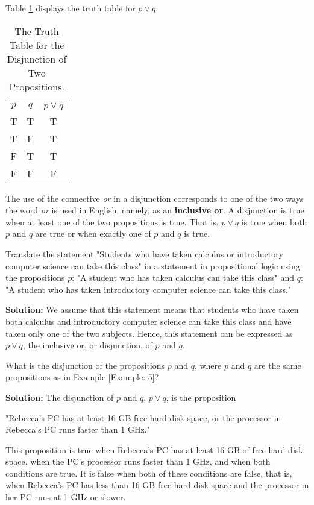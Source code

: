 \documentclass{Axon}
\begin{document}
Table \ref{Table: 3} displays the truth table for \(p \lor q\).

\begin{table}[h]
    \centering
    \begin{tabular}{c|c|c}
        \(p\) & \(q\) & \(p \lor q\)\\
        T     & T     & T\\
        T     & F     & T\\
        F     & T     & T\\
        F     & F     & F
    \end{tabular}
    \caption{The Truth Table for the Disjunction of Two Propositions.}
    \label{Table: 3}
\end{table}

The use of the connective \textit{or} in a disjunction corresponds to one of the two ways the word \textit{or} is used in English, namely, as an \textbf{inclusive or}. A disjunction is true when at least one of the two propositions is true. That is, \(p \lor q\) is true when both \(p\) and \(q\) are true or when exactly one of \(p\) and \(q\) is true.

\begin{example}
    Translate the statement "Students who have taken calculus or introductory computer science can take this class" in a statement in propositional logic using the propositions \(p\): "A student who has taken calculus can take this class" and \(q\): "A student who has taken introductory computer science can take this class."

    \noindent
    \textbf{Solution:}
    We assume that this statement means that students who have taken both calculus and introductory computer science can take this class and have taken only one of the two subjects. Hence, this statement can be expressed as \(p \lor q\), the inclusive or, or disjunction, of \(p\) and \(q\).
\end{example}

\begin{example}
    What is the disjunction of the propositions \(p\) and \(q\), where \(p\) and \(q\) are the same propositions as in Example \ref{Example: 5}?

    \noindent
    \textbf{Solution:}
    The disjunction of \(p\) and \(q\), \(p \lor q\), is the proposition
    \begin{center}
        "Rebecca's PC has at least 16 GB free hard disk space, or the processor in Rebecca's PC runs faster than 1 GHz."
    \end{center}
    This proposition is true when Rebecca's PC has at least 16 GB of free hard disk space, when the PC's processor runs faster than 1 GHz, and when both conditions are true. It is false when both of these conditions are false, that is, when Rebecca's PC has less than 16 GB free hard disk space and the processor in her PC runs at 1 GHz or slower.
\end{example}
\end{document}
